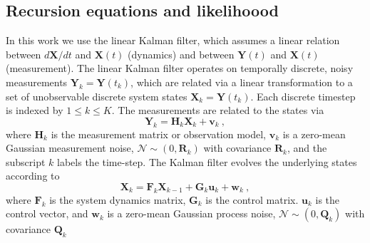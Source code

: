 \documentclass[fleqn,usenatbib,useAMS]{mnras}
\begin{document}
\subsection{Recursion equations and likelihoood }\label{sec_kalman_general}
In this work we use the linear Kalman filter, which assumes a linear relation between $d{\boldsymbol{X}}/dt$ and ${\boldsymbol{X}}(t)$ (dynamics) and between ${\boldsymbol{Y}}(t)$ and ${\boldsymbol{X}}(t)$ (measurement). The linear Kalman filter operates on temporally discrete, noisy measurements $\boldsymbol{Y}_k = \boldsymbol{Y}(t_k)$, which are related via a linear transformation to a set of unobservable discrete system states $\boldsymbol{X}_k= \boldsymbol{Y}(t_k)$. Each discrete timestep is indexed by $ 1 \leq k  \leq K$. The measurements are related to the states via
\begin{equation}
	\boldsymbol{Y}_k = \boldsymbol{H}_k \boldsymbol{X}_k + \boldsymbol{v}_k \ ,\label{eq:kalman1}
\end{equation}
where $\boldsymbol{H}_k$ is the measurement matrix or observation model, $\boldsymbol{v}_k$ is a zero-mean Gaussian measurement noise, $\mathcal{N} \sim (0,\boldsymbol{R}_k)$ with covariance $\boldsymbol{R}_k$, and the subscript $k$ labels the time-step. The Kalman filter evolves the underlying states according to
\begin{equation}
	\boldsymbol{X}_k = \boldsymbol{F}_k \boldsymbol{X}_{k-1} + \boldsymbol{G}_k \boldsymbol{u}_k + \boldsymbol{w}_k \ , \label{eq:kalman2}
\end{equation}
where $\boldsymbol{F}_k$ is the system dynamics matrix, $\boldsymbol{G}_k$ is the control matrix. $\boldsymbol{u}_k$ is the control vector, and $\boldsymbol{w}_k$ is a zero-mean Gaussian process noise, $\mathcal{N} \sim (0,\boldsymbol{Q}_k)$ with covariance $\boldsymbol{Q}_k$ \newline 
\end{document}
